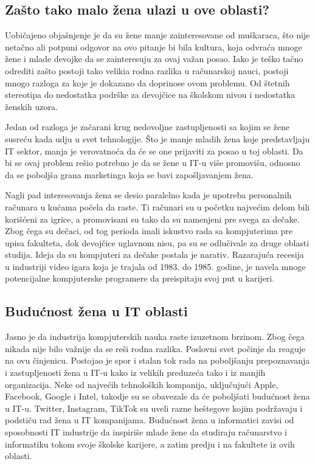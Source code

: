 \documentclass[a4paper,12pt]{article}
\begin{document}
\subsection{Zašto tako malo žena ulazi u ove oblasti? }
\begin{flushleft}
Uobičajeno objašnjenje je da su žene manje zainteresovane od muškaraca, 
što nije netačno ali potpuni odgovor na ovo pitanje bi bila kultura, 
koja odvraća mnoge žene i mlade devojke da se zainteresuju za ovaj važan posao.
Iako je teško tačno odrediti zašto postoji tako velikia rodna razlika u računarskoj nauci, 
postoji mnogo razloga za koje je dokazano da doprinose ovom problemu. 
Od štetnih stereotipa do nedostatka podrške za devojčice na školskom nivou i nedostatka ženskih uzora.

Jedan od razloga je začarani krug nedovoljne zastupljenosti sa kojim se žene susreću kada udju u svet tehnologije. 
Što je manje mladih žena koje predstavljaju IT sektor, manja je verovatnoća da će se one prijaviti za posao u toj oblasti. 
Da bi se ovaj problem rešio potrebno je da se žene u IT-u više promovišu, 
odnosno da se poboljša grana marketinga koja se bavi zapošljavanjem žena.


Nagli pad interesovanja žena se desio paralelno kada je upotreba personalnih računara u kućama počela da raste. 
Ti računari su u početku najvećim delom bili korišćeni za igrice, a promovisani su tako da su namenjeni pre svega za dečake. 
Zbog čega su dečaci, od tog perioda imali iskustvo rada sa kompjuterima pre upisa fakulteta, dok devojčice uglavnom nisu, 
pa su se odlučivale za druge oblasti studija. Ideja da su kompjuteri za dečake postala je narativ. 
Razarajuća recesija u industriji video igara koja je trajala od 1983. do 1985. godine, je navela mnoge potencijalne 
kompjuterske programere da preispitaju svoj put u karijeri. 
\end{flushleft}


\subsection{Budućnost žena u IT oblasti}
\begin{flushleft}
Jasno je da industrija kompjuterskih nauka raste izuzetnom brzinom. Zbog čega nikada nije bilo važnije da se reši rodna razlika.
Poslovni svet počinje da reaguje na ovu činjenicu. Postojao je spor i stalan tok rada na poboljšanju prepoznavanja i zastupljenosti
žena u IT-u kako iz velikih preduzeća tako i iz manjih organizacija. Neke od najvećih tehnoloških kompanija, uključujući Apple, 
Facebook, Google i Intel, takodje su se obavezale da će poboljšati budućnost žena u IT-u. Twitter, Instagram, TikTok su uveli razne 
heštegove kojim podržavaju i podstiču rad žena u IT kompanijama. Budućnost žena u informatici zavisi od sposobnosti IT industrije 
da inspiriše mlade žene da studiraju računarstvo i informatiku tokom svoje školske karijere, a zatim predju i na fakultete iz ovih oblasti.
\end{flushleft}

\newpage



\cite{ashcraft2016women}
\cite{branson2018future}
\cite{mauchly1980eniac}
\cite{punt2018ada}
\cite{actionmargaret}
\end{document}
